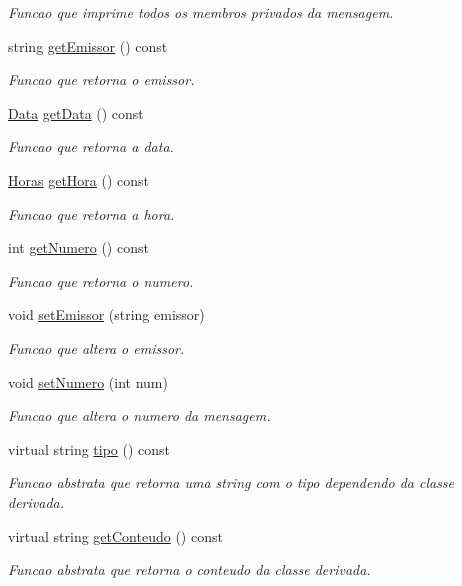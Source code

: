 \begin{DoxyCompactItemize}
\begin{DoxyCompactList}\small\item\em Funcao que imprime todos os membros privados da mensagem. \end{DoxyCompactList}\item 
string \hyperlink{class_mensagem_a5438dfe93aec2e6512042704e134d5db}{get\+Emissor} () const 
\begin{DoxyCompactList}\small\item\em Funcao que retorna o emissor. \end{DoxyCompactList}\item 
\hyperlink{class_data}{Data} \hyperlink{class_mensagem_a8d3b52e1c20fac96c4df60c79b5b7846}{get\+Data} () const 
\begin{DoxyCompactList}\small\item\em Funcao que retorna a data. \end{DoxyCompactList}\item 
\hyperlink{class_horas}{Horas} \hyperlink{class_mensagem_a7285a85c11aea596e25c6f87a68ad86f}{get\+Hora} () const 
\begin{DoxyCompactList}\small\item\em Funcao que retorna a hora. \end{DoxyCompactList}\item 
int \hyperlink{class_mensagem_a376309b58e69c41bf10acb7adad7bd3d}{get\+Numero} () const 
\begin{DoxyCompactList}\small\item\em Funcao que retorna o numero. \end{DoxyCompactList}\item 
void \hyperlink{class_mensagem_a74d42818d3796b28496f400e02328c92}{set\+Emissor} (string emissor)
\begin{DoxyCompactList}\small\item\em Funcao que altera o emissor. \end{DoxyCompactList}\item 
void \hyperlink{class_mensagem_a042a57d4dca817ed0450340b42111a9a}{set\+Numero} (int num)
\begin{DoxyCompactList}\small\item\em Funcao que altera o numero da mensagem. \end{DoxyCompactList}\item 
virtual string \hyperlink{class_mensagem_a3d814fb7b7540c4df98f522208e0c1ac}{tipo} () const 
\begin{DoxyCompactList}\small\item\em Funcao abstrata que retorna uma string com o tipo dependendo da classe derivada. \end{DoxyCompactList}\item 
virtual string \hyperlink{class_mensagem_ab4bbb32ae268565c8f87c370f9793db6}{get\+Conteudo} () const 
\begin{DoxyCompactList}\small\item\em Funcao abstrata que retorna o conteudo da classe derivada. \end{DoxyCompactList}\end{DoxyCompactItemize}
